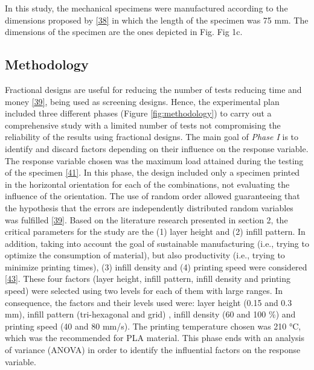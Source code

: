 \documentclass[conference,final,]{IEEEtran}
\begin{document}
In this study, the mechanical specimens were manufactured according to
the dimensions proposed by \protect\hyperlink{ref-Lin2018}{{[}38{]}} in
which the length of the specimen was 75 mm. The dimensions of the
specimen are the ones depicted in Fig. Fig 1c.

\hypertarget{methodology}{%
\subsection{Methodology}\label{methodology}}

Fractional designs are useful for reducing the number of tests reducing
time and money \protect\hyperlink{ref-Montgomery2001}{{[}39{]}}, being
used as screening designs. Hence, the experimental plan included three
different phases (Figure \ref{fig:methodology}) to carry out a
comprehensive study with a limited number of tests not compromising the
reliability of the results using fractional designs. The main goal of
\emph{Phase I} is to identify and discard factors depending on their
influence on the response variable. The response variable chosen was the
maximum load attained during the testing of the specimen
\protect\hyperlink{ref-Letcher2015}{{[}41{]}}. In this phase, the design
included only a specimen printed in the horizontal orientation for each
of the combinations, not evaluating the influence of the orientation.
The use of random order allowed guaranteeing that the hypothesis that
the errors are independently distributed random variables was fulfilled
\protect\hyperlink{ref-Montgomery2001}{{[}39{]}}. Based on the
literature research presented in section 2, the critical parameters for
the study are the (1) layer height and (2) infill pattern. In addition,
taking into account the goal of sustainable manufacturing (i.e., trying
to optimize the consumption of material), but also productivity (i.e.,
trying to minimize printing times), (3) infill density and (4) printing
speed were considered \protect\hyperlink{ref-Tanveer2019}{{[}43{]}}.
These four factors (layer height, infill pattern, infill density and
printing speed) were selected using two levels for each of them with
large ranges. In consequence, the factors and their levels used were:
layer height (0.15 and 0.3 mm), infill pattern (tri-hexagonal and grid)
, infill density (60 and 100 \%) and printing speed (40 and 80 mm/s).
The printing temperature chosen was 210 °C, which was the recommended
for PLA material. This phase ends with an analysis of variance (ANOVA)
in order to identify the influential factors on the response variable.
\end{document}
